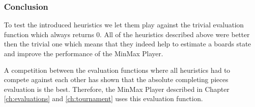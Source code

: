 \subsubsection*{Conclusion}
To test the introduced heuristics we let them play against the trivial evaluation function which always returns 0. All of the heuristics described above were better then the trivial one which means that they indeed help to estimate a boards state and improve the performance of the MinMax Player.

A competition between the evaluation functions where all heuristics had to compete against each other has shown that the absolute completing pieces evaluation is the best. Therefore, the MinMax Player described in Chapter \ref{ch:evaluations} and \ref{ch:tournament} uses this evaluation function.
